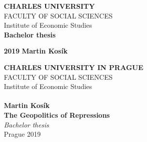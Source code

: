 \pagestyle{empty}
\begin{center}
\textbf{\LARGE{CHARLES UNIVERSITY}}\\
\Large{FACULTY OF SOCIAL SCIENCES}\\
\large{Institute of Economic Studies} \\
\vspace{60mm} \textbf{\LARGE{Bachelor thesis}}\\
\end{center}
\vspace{100mm} \textbf{\LARGE{2019}}  \hspace {70mm} \textbf{\LARGE{Martin Kosík}}\\
\vspace{11mm}
\newpage

\pagestyle{empty}
\begin{center}
\textbf{\LARGE{CHARLES UNIVERSITY IN PRAGUE}}\\
\Large{FACULTY OF SOCIAL SCIENCES}\\
\large{Institute of Economic Studies} \\
\\  %
\textbf{\large{Martin Kosík
}} \\
\vspace{10mm} \textbf{\LARGE{The Geopolitics of Repressions }}\\
\vspace{11mm} \textit{\Large{Bachelor thesis}} \\
\vspace{40mm} \large{Prague 2019}

\end{center}
\newpage


